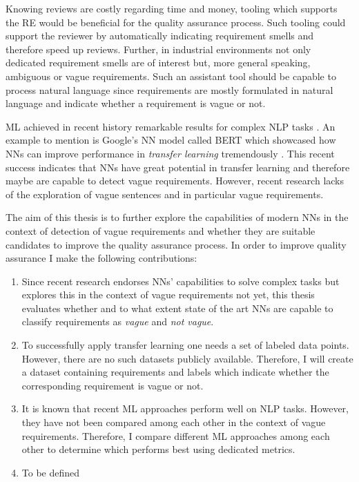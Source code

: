 Knowing reviews are costly regarding time and money, tooling which supports the \ac{RE} would be beneficial for the quality assurance process.
Such tooling could support the reviewer by automatically indicating requirement smells and therefore speed up reviews.
Further, in industrial environments not only dedicated requirement smells are of interest but, more general speaking, ambiguous or vague requirements.
Such an assistant tool should be capable to process natural language since requirements are mostly formulated in natural language \parencite{Mich:2004} and indicate whether a requirement is vague or not.

\Ac{ML} achieved in recent history remarkable results for complex \ac{NLP} tasks \parencite{Khan:2016}.
An example to mention is Google's \ac{NN} model called BERT which showcased how \acp{NN} can improve performance in \textit{transfer learning} tremendously \parencite{Devlin:2018}.
This recent success indicates that \acp{NN} have great potential in transfer learning and therefore maybe are capable to detect vague requirements.
However, recent research lacks of the exploration of vague sentences and in particular vague requirements.

The aim of this thesis is to further explore the capabilities of modern \acp{NN} in the context of detection of vague requirements and whether they are suitable candidates to improve the quality assurance process.
In order to improve quality assurance I make the following contributions:
\begin{enumerate}
    \item Since recent research endorses \acp{NN}' capabilities to solve complex tasks but explores this in the context of vague requirements not yet, this thesis evaluates whether and to what extent state of the art \acp{NN} are capable to classify requirements as \textit{vague} and \textit{not vague}.
    \item To successfully apply transfer learning one needs a set of labeled data points. However, there are no such datasets publicly available.
        Therefore, I will create a dataset containing requirements and labels which indicate whether the corresponding requirement is vague or not.
    \item It is known that recent \ac{ML} approaches perform well on \ac{NLP} tasks.
        However, they have not been compared among each other in the context of vague requirements.
        Therefore, I compare different \ac{ML} approaches among each other to determine which performs best using dedicated metrics.
    \item To be defined %
\end{enumerate}
